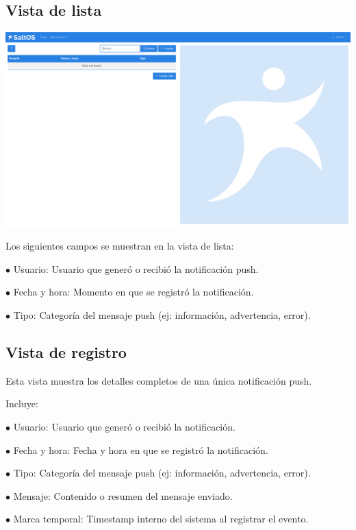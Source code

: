 \documentclass[a4paper]{article}
\begin{document}
\hypertarget{toc23}{}
\subsection{Vista de lista}

\begin{center}\includegraphics[width=1\textwidth]{../ujest/snaps/test-screenshots-js-screenshots-common-pushlog-list-es-es-1-snap.png}\end{center}

Los siguientes campos se muestran en la vista de lista:

\begin{compactitem}
\item[\color{myblue}$\bullet$] Usuario: Usuario que generó o recibió la notificación push.
\item[\color{myblue}$\bullet$] Fecha y hora: Momento en que se registró la notificación.
\item[\color{myblue}$\bullet$] Tipo: Categoría del mensaje push (ej: información, advertencia, error).
\end{compactitem}

\hypertarget{toc24}{}
\subsection{Vista de registro}

Esta vista muestra los detalles completos de una única notificación push.

Incluye:

\begin{compactitem}
\item[\color{myblue}$\bullet$] Usuario: Usuario que generó o recibió la notificación.
\item[\color{myblue}$\bullet$] Fecha y hora: Fecha y hora en que se registró la notificación.
\item[\color{myblue}$\bullet$] Tipo: Categoría del mensaje push (ej: información, advertencia, error).
\item[\color{myblue}$\bullet$] Mensaje: Contenido o resumen del mensaje enviado.
\item[\color{myblue}$\bullet$] Marca temporal: Timestamp interno del sistema al registrar el evento.
\end{compactitem}
\end{document}
